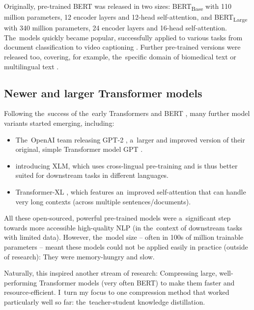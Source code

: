 \documentclass[bsc,frontabs,singlespacing,parskip,deptreport]{infthesis}
\begin{document}
{{{      Originally, pre-trained BERT was released in two sizes: BERT\textsubscript{Base} with 110 million parameters, 12 encoder layers and 12-head self-attention, and BERT\textsubscript{Large} with 340 million parameters, 24 encoder layers and 16-head self-attention. The~models quickly became popular, successfully applied to various tasks from document classification \citep{Adhikari_2019} to video captioning \citep{Sun_2019}. Further pre-trained versions were released too, covering, for example, the~specific domain of biomedical text \citep{Lee_2019} or multilingual text \citep{Pires_2019}.
    }

    \subsection{Newer and larger Transformer models}{
      \label{sec:post-BERT-models}
      Following the~success of the~early Transformers and BERT \citep{Vaswani_2017,Radford_2018,Devlin_2018}, many further model variants started emerging, including:
      \begin{itemize}
        \item The~OpenAI team releasing GPT-2 \citep{Radford_2019}, a~larger and improved version of their original, simple Transformer model GPT \citep{Radford_2018}.
        \item \citet{Lample_2019} introducing XLM, which uses cross-lingual pre-training and is thus better suited for downstream tasks in different languages.
        \item Transformer-XL \citep{Dai_2019}, which features an~improved self-attention that can handle very long contexts (across multiple sentences/documents).
      \end{itemize}

      All these open-sourced, powerful pre-trained models were a~significant step towards more accessible high-quality NLP (in the~context of downstream tasks with limited data). However, the~model size -- often in 100s of million trainable parameters -- meant these models could not be applied easily in practice (outside of research): They were memory-hungry and slow.
      
      Naturally, this inspired another stream of research: Compressing large, well-performing Transformer models (very often BERT) to make them faster and resource-efficient.
      I~turn my focus to one compression method that worked particularly well so far: the~teacher-student knowledge distillation.
    }
  }

}
\end{document}
